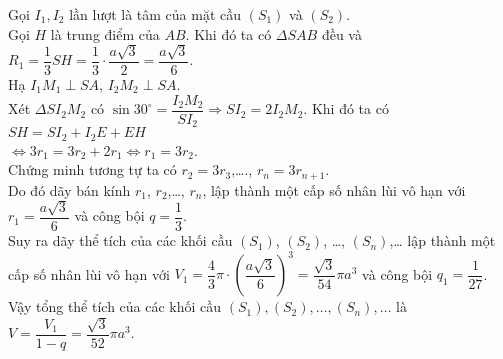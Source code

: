 \begin{ex}
{\begin{center}
		\end{center}
		Gọi $I_1,I_2$ lần lượt là tâm của mặt cầu $(S_1)$ và $(S_2)$.\\
		Gọi $H$ là trung điểm của $AB$. Khi đó ta có $\Delta SAB$ đều và $R_1=\dfrac{1}{3}SH=\dfrac{1}{3}\cdot\dfrac{a\sqrt{3}}{2}=\dfrac{a\sqrt{3}}{6}$.\\
		Hạ $I_1M_1\perp SA$, $I_2M_2\perp SA$.\\
		Xét $\Delta SI_2M_2$ có $\sin 30^{\circ}=\dfrac{I_2M_2}{SI_2}\Rightarrow SI_2=2I_2M_2$. Khi đó ta có $SH=SI_2+I_2E+EH$ \\
		$ \Leftrightarrow 3r_1=3r_2+2r_1\Leftrightarrow r_1=3r_2 $.\\
		Chứng minh tương tự ta có $r_2=3r_3$,…., $r_n=3r_{n+1}$.\\
		Do đó dãy bán kính $r_1$, $r_2$,…, $r_n$, lập thành một cấp số nhân lùi vô hạn với $r_1=\dfrac{a\sqrt{3}}{6}$ và công bội $q=\dfrac{1}{3}$.\\
		Suy ra dãy thể tích của các khối cầu $(S_1)$, $(S_2)$, …, $(S_n)$,… lập thành một cấp số nhân lùi vô hạn với $V_1=\dfrac{4}{3}\pi\cdot\left(\dfrac{a\sqrt{3}}{6}\right)^3=\dfrac{\sqrt{3}}{54}\pi a^3$ và công bội $q_1=\dfrac{1}{27}$.\\
		Vậy tổng thể tích của các khối cầu $(S_1),(S_2),\ldots,(S_n),\ldots$ là $V=\dfrac{V_1}{1-q}=\dfrac{\sqrt{3}}{52}\pi a^3$.}
\end{ex}
